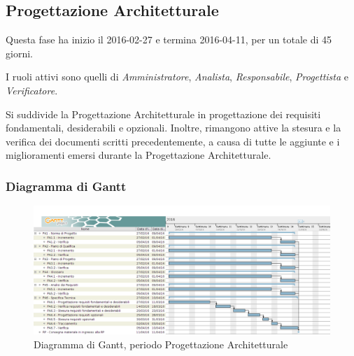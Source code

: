 \newpage

\subsection{Progettazione Architetturale}
Questa fase ha inizio il 2016-02-27 e termina 2016-04-11, per un totale di 45 giorni.

I ruoli attivi sono quelli di \textit{Amministratore}, \textit{Analista}, \textit{Responsabile}, \textit{Progettista} e \textit{Verificatore}.

Si suddivide la Progettazione Architetturale in progettazione dei requisiti fondamentali, desiderabili e opzionali. Inoltre, rimangono attive la stesura e la verifica dei documenti scritti precedentemente, a causa di tutte le aggiunte e i miglioramenti emersi durante la Progettazione Architetturale.

\subsubsection{Diagramma di Gantt}
\begin{figure}[ht!]
  \includegraphics[width=1\textwidth]{res/img/pianificazione/ProgettazioneArchitetturale}
  \caption{Diagramma di Gantt, periodo Progettazione Architetturale}
\end{figure}

